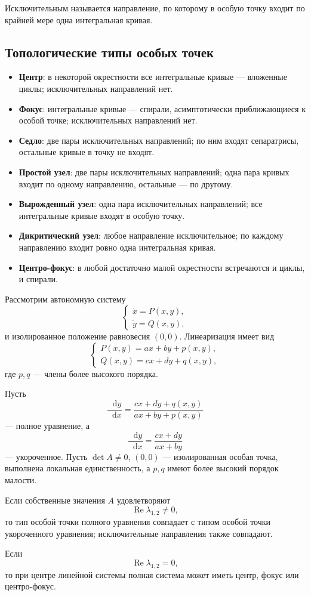 \documentclass[12pt,a4paper]{article}
\numberwithin{equation}{section}
\renewcommand{\Re}{\operatorname{Re}}
\newcommand{\dd}{\mathop{}\!\mathrm{d}}
\begin{document}
\begin{definitionHSE}
Исключительным называется направление, по которому в особую точку входит по крайней мере одна интегральная кривая.
\end{definitionHSE}

\subsection{Топологические типы особых точек}
\begin{itemize}
  \item \textbf{Центр}: в некоторой окрестности все интегральные кривые --- вложенные циклы; исключительных направлений нет.
  \item \textbf{Фокус}: интегральные кривые --- спирали, асимптотически приближающиеся к особой точке; исключительных направлений нет.
  \item \textbf{Седло}: две пары исключительных направлений; по ним входят сепаратрисы, остальные кривые в точку не входят.
  \item \textbf{Простой узел}: две пары исключительных направлений; одна пара кривых входит по одному направлению, остальные --- по другому.
  \item \textbf{Вырожденный узел}: одна пара исключительных направлений; все интегральные кривые входят в особую точку.
  \item \textbf{Дикритический узел}: любое направление исключительное; по каждому направлению входит ровно одна интегральная кривая.
  \item \textbf{Центро-фокус}: в любой достаточно малой окрестности встречаются и циклы, и спирали.
\end{itemize}

Рассмотрим автономную систему
\[
\begin{cases}
\dot x=P(x,y),\\
\dot y=Q(x,y),
\end{cases}
\]
и изолированное положение равновесия $(0,0)$. Линеаризация имеет вид
\[
\begin{cases}
P(x,y)=ax+by+p(x,y),\\
Q(x,y)=cx+dy+q(x,y),
\end{cases}
\]
где $p,q$ --- члены более высокого порядка.

\begin{theoremHSE}
Пусть
\[
\frac{\dd y}{\dd x}
=
\frac{cx+dy+q(x,y)}{ax+by+p(x,y)}
\]
--- полное уравнение, а
\[
\frac{\dd y}{\dd x}
=
\frac{cx+dy}{ax+by}
\]
--- укороченное. Пусть $\det A\neq0$, $(0,0)$ --- изолированная особая точка, выполнена локальная единственность, а $p,q$ имеют более высокий порядок малости.

Если собственные значения $A$ удовлетворяют
\[
\Re\lambda_{1,2}\neq0,
\]
то тип особой точки полного уравнения совпадает с типом особой точки укороченного уравнения; исключительные направления также совпадают.

Если
\[
\Re\lambda_{1,2}=0,
\]
то при центре линейной системы полная система может иметь центр, фокус или центро-фокус.
\end{theoremHSE}
\end{document}
